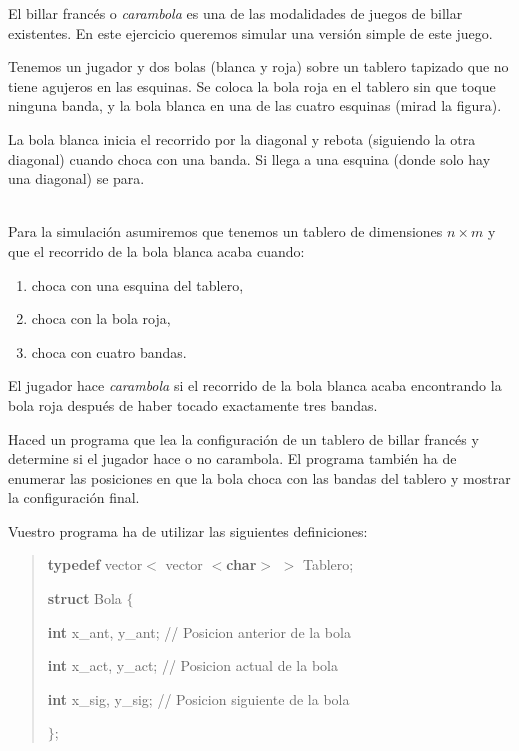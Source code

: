 
\Statement

El billar francés o \emph{carambola} es una de las modalidades de juegos de billar existentes. En este ejercicio queremos simular una versión simple de este juego. 

Tenemos un jugador y dos bolas (blanca y roja) sobre un tablero tapizado que no tiene agujeros en las esquinas. Se coloca la bola roja en el tablero sin que toque ninguna banda, y la bola blanca en una de las cuatro esquinas (mirad la figura).

La bola blanca inicia el recorrido por la diagonal y rebota (siguiendo la otra diagonal) cuando choca con una banda.  Si llega a una esquina (donde solo hay una diagonal) se para.


\ \\ 
Para la simulación asumiremos que tenemos un tablero de dimensiones $n\times m$ y que el recorrido de la  bola blanca acaba cuando:

\begin{enumerate}
    \item choca con una esquina del tablero, 
    \item choca con la bola roja,  
    \item choca con cuatro bandas.
\end{enumerate}

El jugador hace \emph{carambola} si el recorrido de la bola blanca acaba encontrando la bola roja después de haber tocado exactamente tres bandas. 

\smallskip
Haced un programa que lea la configuración de un tablero de billar francés y determine si el jugador hace o no carambola. El programa también ha de enumerar las posiciones en que la bola choca con las bandas del tablero y mostrar la configuración final. 


Vuestro programa ha de utilizar las siguientes definiciones:

\begin{quote}

\textbf{typedef} vector$<$ vector $<$\textbf{char}$>$ $>$ Tablero;

\textbf{struct}  Bola $\{$ 

\hspace{10pt} \textbf{int} x\_ant, y\_ant;\hspace{10pt} // Posicion anterior de la bola

\hspace{10pt} \textbf{int} x\_act, y\_act;\hspace{11pt} // Posicion actual de la bola

\hspace{10pt} \textbf{int} x\_sig, y\_sig;\hspace{10pt} // Posicion siguiente de la bola

$\}$;

\end{quote}

